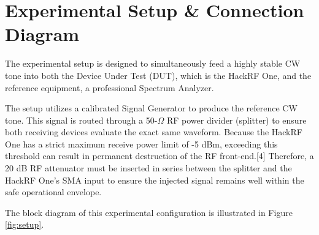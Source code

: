 \documentclass[journal, a4paper]{IEEEtran}
\begin{document}
\section{Experimental Setup \& Connection Diagram}

The experimental setup is designed to simultaneously feed a highly stable CW tone into both the Device Under Test (DUT), which is the HackRF One, and the reference equipment, a professional Spectrum Analyzer. 

The setup utilizes a calibrated Signal Generator to produce the reference CW tone. This signal is routed through a 50-$\Omega$ RF power divider (splitter) to ensure both receiving devices evaluate the exact same waveform. Because the HackRF One has a strict maximum receive power limit of -5 dBm, exceeding this threshold can result in permanent destruction of the RF front-end.[4] Therefore, a 20 dB RF attenuator must be inserted in series between the splitter and the HackRF One's SMA input to ensure the injected signal remains well within the safe operational envelope.

The block diagram of this experimental configuration is illustrated in Figure \ref{fig:setup}.
\end{document}
